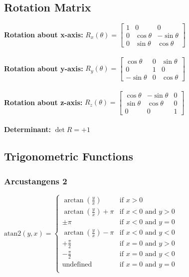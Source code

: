 \documentclass[10pt,a4paper]{article}
\newcommand{\atan}{\ensuremath{\mathrm{atan2 }}}
\begin{document}
\subsection{Rotation Matrix}
\textbf{Rotation about x-axis:}
$R_x(\theta) = \begin{bmatrix}
	1 & 0 & 0 \\
	0 & \cos \theta & -\sin \theta \\
	0 & \sin \theta & \cos \theta 
\end{bmatrix}$ \\
\\

\textbf{Rotation about y-axis:}
$R_y(\theta) = \begin{bmatrix}
	\cos \theta & 0 & \sin \theta \\
	0 & 1 & 0 \\
	-\sin \theta & 0 & \cos \theta
\end{bmatrix}$ \\
\\

\textbf{Rotation about z-axis:}
$R_z(\theta) = \begin{bmatrix}
	\cos \theta & -\sin \theta & 0 \\
	\sin \theta & \cos \theta & 0 \\
	0 & 0 & 1
\end{bmatrix}$ \\
\\

\textbf{Determinant:}
$\det R = +1$

\subsection{Trigonometric Functions}

\subsubsection{Arcustangens 2}
$\atan(y,x) = \begin{cases}
	\arctan (\frac y x) & \text{if } x > 0 \\
	\arctan (\frac y x) + \pi & \text{if } x < 0 \text{ and } y > 0 \\
	\pm \pi & \text{if } x < 0 \text{ and } y = 0 \\
	\arctan (\frac y x) - \pi & \text{if } x < 0 \text{ and } y < 0 \\
	+ \frac \pi 2 & \text{if } x = 0 \text{ and } y > 0 \\
	- \frac \pi 2 & \text{if } x = 0 \text{ and } y < 0 \\
	\text{undefined} & \text{if } x = 0 \text{ and } y = 0 \\
\end{cases}$
\end{document}
